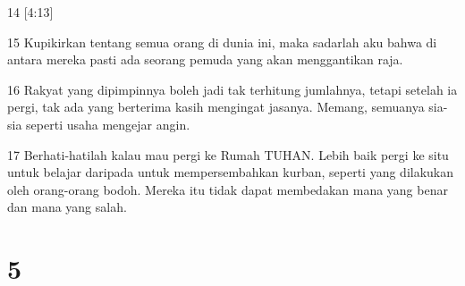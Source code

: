 \par 14 [4:13]
\par 15 Kupikirkan tentang semua orang di dunia ini, maka sadarlah aku bahwa di antara mereka pasti ada seorang pemuda yang akan menggantikan raja.
\par 16 Rakyat yang dipimpinnya boleh jadi tak terhitung jumlahnya, tetapi setelah ia pergi, tak ada yang berterima kasih mengingat jasanya. Memang, semuanya sia-sia seperti usaha mengejar angin.
\par 17 Berhati-hatilah kalau mau pergi ke Rumah TUHAN. Lebih baik pergi ke situ untuk belajar daripada untuk mempersembahkan kurban, seperti yang dilakukan oleh orang-orang bodoh. Mereka itu tidak dapat membedakan mana yang benar dan mana yang salah.

\chapter{5}

